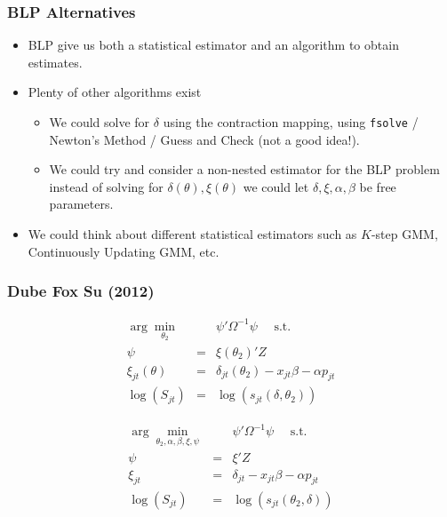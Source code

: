 \documentclass[xcolor=pdftex,dvipsnames,table,mathserif,aspectratio=169]{beamer}
\begin{document}
 \begin{frame}
\frametitle{BLP Alternatives}
\begin{itemize}
 \item BLP give us both a statistical \alert{estimator} and an \alert{algorithm} to obtain estimates.
\item Plenty of other algorithms exist
\begin{itemize}
\item We could solve for $\delta$ using the contraction mapping, using \texttt{fsolve} / Newton's Method / Guess and Check (not a good idea!).
\item We could try and consider a non-nested estimator for the BLP problem instead of solving for $\delta(\theta),\xi(\theta)$ we could let $\delta,\xi,\alpha,\beta$ be free parameters.
 \end{itemize}
\item We could think about different statistical estimators such as $K$-step GMM, Continuously Updating GMM, etc.
 \end{itemize}
\end{frame}


 \begin{frame}\frametitle{Dube Fox Su (2012)}
\footnotesize
\begin{eqnarray}
\label{blpnfxp}
\nonumber \arg \min_{\theta_2} && \psi' \Omega^{-1} \psi \quad \mbox{ s.t. } \\
\nonumber \psi &=& \xi(\theta_2)' Z\\
\xi_{jt}(\theta) &=& \delta_{jt}(\theta_2) - x_{jt} \beta - \alpha p_{jt} \\
\nonumber \log(S_{jt})  &=& \log(s_{jt}(\delta,\theta_2))
\end{eqnarray}

\begin{eqnarray}
\label{blpmpec}
\nonumber \arg \min_{\theta_2,\alpha,\beta, \xi,\psi} && \psi' \Omega^{-1}  \psi \quad \mbox{ s.t. } \\
 \psi &=& \xi' Z\\
\nonumber \xi_{jt} &=& \delta_{jt} - x_{jt} \beta - \alpha p_{jt} \\
\nonumber \log(S_{jt})  &=& \log(s_{jt}(\theta_2, \delta))
\end{eqnarray}
\end{frame}
\end{document}
